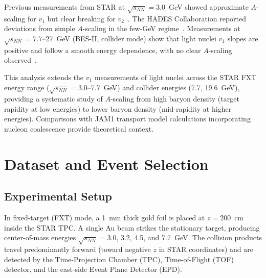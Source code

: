 \documentclass[aps,prc,preprint,superscriptaddress,nofootinbib]{revtex4-2}
\begin{document}
Previous measurements from STAR at $\sqrt{s_{NN}} = 3.0$~GeV showed approximate $A$-scaling for $v_1$ but clear breaking for $v_2$~\cite{STAR:2021yiu}. The HADES Collaboration reported deviations from simple $A$-scaling in the few-GeV regime~\cite{HADES:2020lob}. Measurements at $\sqrt{s_{NN}} = 7.7$--27~GeV (BES-II, collider mode) show that light nuclei $v_1$ slopes are positive and follow a smooth energy dependence, with no clear $A$-scaling observed~\cite{Wang:2026}.

This analysis extends the $v_1$ measurements of light nuclei across the STAR FXT energy range ($\sqrt{s_{NN}} = 3.0$--7.7~GeV) and collider energies (7.7, 19.6~GeV), providing a systematic study of $A$-scaling from high baryon density (target rapidity at low energies) to lower baryon density (mid-rapidity at higher energies). Comparisons with JAM1 transport model calculations incorporating nucleon coalescence provide theoretical context.

\section{Dataset and Event Selection}
\label{sec:dataset}

\subsection{Experimental Setup}
\label{subsec:setup}

In fixed-target (FXT) mode, a 1~mm thick gold foil is placed at $z = 200$~cm inside the STAR TPC. A single Au beam strikes the stationary target, producing center-of-mass energies $\sqrt{s_{NN}} = 3.0$, 3.2, 4.5, and 7.7~GeV. The collision products travel predominantly forward (toward negative $z$ in STAR coordinates) and are detected by the Time-Projection Chamber (TPC), Time-of-Flight (TOF) detector, and the east-side Event Plane Detector (EPD).
\end{document}
